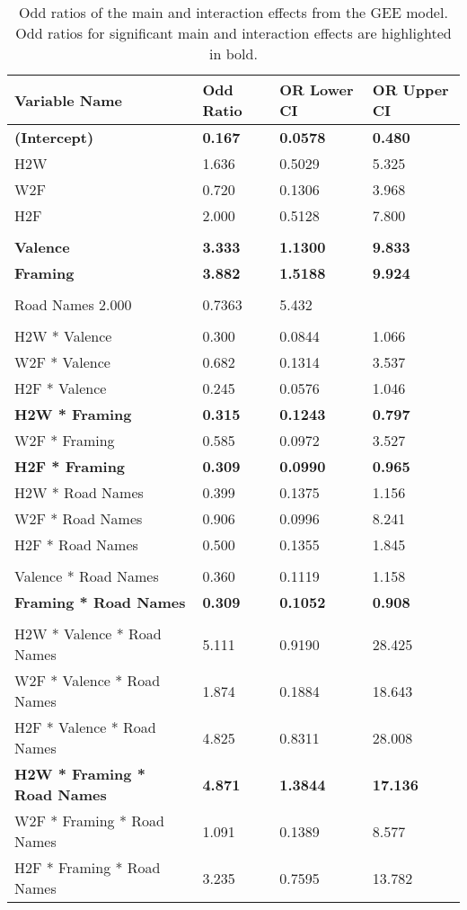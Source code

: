 \begin{table}[t]
    \caption{Odd ratios of the main and interaction effects from the GEE model. Odd ratios for significant main and interaction effects are highlighted in bold.}
	\label{tab:s3-gee-or}
	\centering
	\begin{tabular}{llll}
        \hline\hline
        Variable Name & Odd Ratio & OR Lower CI & OR Upper CI \\
        \hline
        \textbf{(Intercept)} & \textbf{0.167} & \textbf{0.0578} & \textbf{0.480} \\
        H2W & 1.636 & 0.5029 & 5.325 \\
        W2F & 0.720 & 0.1306 & 3.968 \\
        H2F & 2.000 & 0.5128 & 7.800 \\
        & & & \\
        \textbf{Valence} & \textbf{3.333} & \textbf{1.1300} & \textbf{9.833}  \\
        \textbf{Framing} & \textbf{3.882} & \textbf{1.5188} & \textbf{9.924} \\ 
        & & & \\
        Road Names 2.000 & 0.7363 & 5.432 \\
        & & & \\
        H2W * Valence & 0.300 & 0.0844 & 1.066 \\
        W2F * Valence & 0.682 & 0.1314 & 3.537 \\
        H2F * Valence & 0.245 & 0.0576 & 1.046 \\
        \textbf{H2W * Framing} & \textbf{0.315} & \textbf{0.1243} & \textbf{0.797}  \\
        W2F * Framing & 0.585 & 0.0972 & 3.527 \\
        \textbf{H2F * Framing} & \textbf{0.309} & \textbf{0.0990} & \textbf{0.965}  \\
        H2W * Road Names & 0.399 & 0.1375 & 1.156 \\
        W2F * Road Names & 0.906 & 0.0996 & 8.241 \\
        H2F * Road Names & 0.500 & 0.1355 & 1.845 \\
        & & & \\
        Valence * Road Names & 0.360 & 0.1119 & 1.158 \\
        \textbf{Framing * Road Names} & \textbf{0.309} & \textbf{0.1052} & \textbf{0.908}   \\
        & & & \\
        H2W * Valence * Road Names & 5.111 & 0.9190 & 28.425 \\
        W2F * Valence * Road Names & 1.874 & 0.1884 & 18.643 \\
        H2F * Valence * Road Names & 4.825 & 0.8311 & 28.008 \\
        \textbf{H2W * Framing * Road Names} & \textbf{4.871} & \textbf{1.3844} & \textbf{17.136}   \\
        W2F * Framing * Road Names & 1.091 & 0.1389 & 8.577 \\
        H2F * Framing * Road Names & 3.235 & 0.7595 & 13.782 \\
        \hline
    \end{tabular}
\end{table}